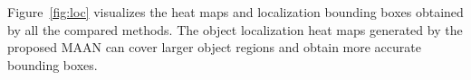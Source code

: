 \documentclass{article} \usepackage{iclr2019_conference,times}
\begin{document}
Figure~\ref{fig:loc} visualizes the heat maps and localization bounding boxes obtained by all the compared methods. The object localization heat maps generated by the proposed MAAN can cover larger object regions and obtain more accurate bounding boxes. 















































 
\end{document}
